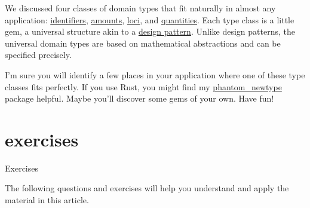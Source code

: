 \documentclass{article}
\begin{document}
We discussed four classes of domain types that fit naturally in almost any application: \href{#identifiers}{identifiers}, \href{#amounts}{amounts}, \href{#loci}{loci}, and \href{#quantities}{quantities}.
Each type class is a little gem, a universal structure akin to a \href{https://en.wikipedia.org/wiki/Software_design_pattern}{design pattern}.
Unlike design patterns, the universal domain types are based on mathematical abstractions and can be specified precisely.

I'm sure you will identify a few places in your application where one of these type classes fits perfectly.
If you use Rust, you might find my \href{https://crates.io/crates/phantom_newtype}{phantom\_newtype} package helpful.
Maybe you'll discover some gems of your own.
Have fun!

\section{exercises}{Exercises}

The following questions and exercises will help you understand and apply the material in this article.

\end{document}
